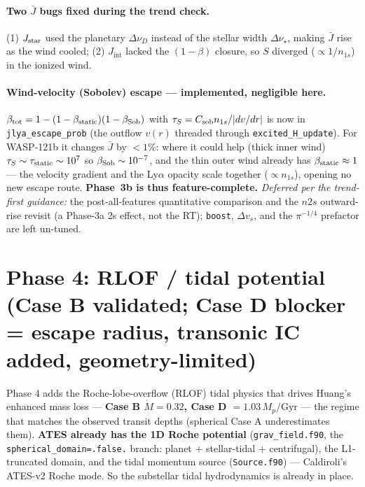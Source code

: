 \documentclass[english,a4paper]{kiseon_memo}
\begin{document}
\paragraph{Two \(\bar J\) bugs fixed during the trend check.} (1) \(J_{\rm star}\)
used the planetary \(\Delta\nu_D\) instead of the stellar width \(\Delta\nu_\star\),
making \(\bar J\) rise as the wind cooled; (2) \(J_{\mathrm{int}}\) lacked the
\((1-\beta)\) closure, so \(S\) diverged (\(\propto1/n_{1s}\)) in the ionized wind.
\paragraph{Wind-velocity (Sobolev) escape --- implemented, negligible here.}
\(\beta_{\rm tot}=1-(1-\beta_{\rm static})(1-\beta_{\rm Sob})\) with
\(\tau_S=C_{\rm sob}n_{1s}/|dv/dr|\) is now in \texttt{jlya\_escape\_prob} (the
outflow \(v(r)\) threaded through \texttt{excited\_H\_update}). For WASP-121b it
changes \(\bar J\) by \(<1\%\): where it could help (thick inner wind)
\(\tau_S\sim\tau_{\rm static}\sim10^7\) so \(\beta_{\rm Sob}\sim10^{-7}\), and the
thin outer wind already has \(\beta_{\rm static}\approx1\) --- the velocity gradient
and the Ly\(\alpha\) opacity scale together (\(\propto n_{1s}\)), opening no new
escape route. \textbf{Phase~3b is thus feature-complete.} \emph{Deferred per the
trend-first guidance:} the post-all-features quantitative comparison and the
\(n2s\) outward-rise revisit (a Phase-3a 2s effect, not the RT); \texttt{boost},
\(\Delta v_s\), and the \(\pi^{-1/4}\) prefactor are left un-tuned.

\section{Phase 4: RLOF / tidal potential (Case B validated; Case D blocker = escape radius, transonic IC added, geometry-limited)}

Phase 4 adds the Roche-lobe-overflow (RLOF) tidal physics that drives Huang's
enhanced mass loss --- \textbf{Case B \(\dot M=0.32\), Case D \(=1.03\,M_p/\mathrm{Gyr}\)}
--- the regime that matches the observed transit depths (spherical Case A
underestimates them). \textbf{ATES already has the 1D Roche potential}
(\texttt{grav\_field.f90}, the \texttt{spherical\_domain=.false.} branch:
planet $+$ stellar-tidal $+$ centrifugal), the L1-truncated domain, and the tidal
momentum source (\texttt{Source.f90}) --- Caldiroli's ATES-v2 Roche mode. So the
substellar tidal hydrodynamics is already in place.
\end{document}
